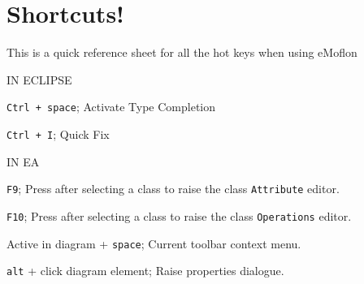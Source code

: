 \newpage
\section{Shortcuts!}
\genHeader

This is a quick reference sheet for all the hot keys when using eMoflon


IN ECLIPSE

\texttt{Ctrl + space}; Activate Type Completion

\texttt{Ctrl + I}; Quick Fix 

IN EA

\texttt{F9}; Press after selecting a class to raise the class \texttt{Attribute} editor.

\texttt{F10}; Press after selecting a class to raise the class \texttt{Operations} editor.

Active in diagram + \texttt{space}; Current toolbar context menu.

\texttt{alt} + click diagram element; Raise properties dialogue.